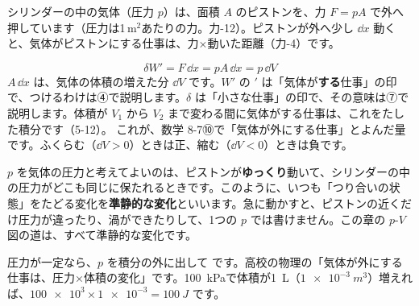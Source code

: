 \label{ph:熱-2:sec3}
\noindent\begin{minipage}[c]{0.46\linewidth}\centering
{}
\end{minipage}\hfill
\begin{minipage}[c]{0.51\linewidth}\raggedright
シリンダーの中の気体（圧力 $p$）は、面積 $A$ のピストンを、力 $F=pA$ で外へ押しています（圧力は1\,m$^2$あたりの力。力-12）。ピストンが外へ少し $\dd x$ 動くと、気体がピストンにする仕事は、力×動いた距離（力-4）です。
\end{minipage}

\par\vspace{4pt}
\[\delta W'=F\,\dd x=pA\,\dd x=p\,\dd V\]
$A\,\dd x$ は、気体の体積の増えた分 $\dd V$ です。$W'$ の $'$ は「気体が\textbf{する}仕事」の印で、つけるわけは④で説明します。$\delta$ は「小さな仕事」の印で、その意味は⑦で説明します。体積が $V_1$ から $V_2$ まで変わる間に気体がする仕事は、これをたした積分です（5-12）。
これが、数学 8-7⑩で「気体が外にする仕事」とよんだ量です。ふくらむ（$\dd V>0$）ときは正、縮む（$\dd V<0$）ときは負です。

\begin{seikaku}
$p$ を気体の圧力と考えてよいのは、ピストンが\textbf{ゆっくり}動いて、シリンダーの中の圧力がどこも同じに保たれるときです。このように、いつも「つり合いの状態」をたどる変化を\textbf{準静的な変化}といいます。急に動かすと、ピストンの近くだけ圧力が違ったり、渦ができたりして、1つの $p$ では書けません。この章の $p$-$V$ 図の道は、すべて準静的な変化です。
\end{seikaku}

圧力が一定なら、$p$ を積分の外に出して
\label{ph:熱-2:pdV}です。高校の物理の「気体が外にする仕事は、圧力×体積の変化」です。\qty{100}{kPa}で体積が\qty{1}{L}（$\qty{1e-3}{m^3}$）増えれば、$\num{100e3}\times\num{1e-3}=\qty{100}{J}$ です。

